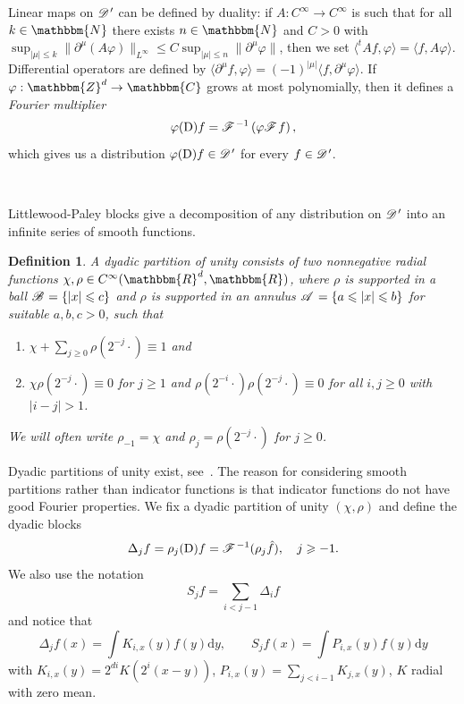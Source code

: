 \documentclass[11pt,reqno]{amsart}
\newcommand{\cdummy}{\cdot}
\newcommand{\mathD}{\mathrm{D}}
\newcommand{\mathd}{\mathrm{d}}
\newcommand{\nosymbol}{}
\newcommand{\tmtextit}[1]{{\itshape{#1}}}
\newtheorem{definition}[theorem]{Definition}
\newcommand{\CD}{\mathscr{D} \hspace{.1em}}
\newcommand{\CF}{\mathscr{F} \hspace{.1em}}
\newcommand{\CB}{\mathscr{B} \hspace{.1em}}
\newcommand{\CA}{\mathscr{A} \hspace{.1em}}
\begin{document}
Linear maps on $\CD'$ can be defined by duality: if $A : C^{\infty}
\rightarrow C^{\infty}$ is such that for all $k \in \mathbbm{N}$ there exists
$n \in \mathbbm{N}$ and $C > 0$ with $\sup_{| \mu | \leqslant k} \|
\partial^{\mu} (A \varphi) \|_{L^{\infty}} \leqslant C \sup_{| \mu | \leqslant
n} \| \partial^{\mu} \varphi \|$, then we set $\langle^t A f, \varphi \rangle
= \langle f, A \varphi \rangle$. Differential operators are defined by
$\langle \partial^{\mu} f, \varphi \rangle = (- 1)^{| \mu |} \langle f,
\partial^{\mu} \varphi \rangle$. If $\varphi : \mathbbm{Z}^d \rightarrow
\mathbbm{C}$ grows at most polynomially, then it defines a \tmtextit{Fourier
multiplier}
\[ \varphi (\mathD) f = \CF^{- 1} \left( \varphi \CF f \right), \]
which gives us a distribution $\varphi (\mathD) f \in \CD'$ for every $f \in
\CD'$.

\

Littlewood-Paley blocks give a decomposition of any distribution on $\CD'$
into an infinite series of smooth functions.

\begin{definition}
  A \tmtextit{dyadic partition of unity} consists of two nonnegative radial
  functions $\chi, \rho \in C^{\infty} (\mathbbm{R}^d, \mathbbm{R})$, where
  $\rho$ is supported in a ball $\CB = \{ | x | \leqslant c \}$ and $\rho$ is
  supported in an annulus $\CA = \{ a \leqslant | x | \leqslant b \}$ for
  suitable $a, b, c > 0$, such that
  \begin{enumerate}
    \item $\chi + \sum_{j \geqslant 0} \rho (2^{- j} \cdummy) \equiv 1$ and
    
    \item \label{property-2-dyadic}$\chi \rho (2^{- j} \cdummy) \equiv 0$ for
    $j \geqslant 1$ and $\rho (2^{- i} \cdummy) \rho (2^{- j} \nosymbol
    \cdummy) \equiv 0$ for all $i, j \geqslant 0$ with $| i - j | > 1$.
  \end{enumerate}
  We will often write $\rho_{- 1} = \chi$ and $\rho_j = \rho (2^{- j}
  \cdummy)$ for $j \geqslant 0$.
\end{definition}

Dyadic partitions of unity exist, see~{\cite{bahouri_fourier_2011}}. The
reason for considering smooth partitions rather than indicator functions is
that indicator functions do not have good Fourier properties. We fix a dyadic
partition of unity $(\chi, \rho)$ and define the dyadic blocks
\[ \Delta_j f = \rho_j (\mathD) f = \CF^{- 1} (\rho_j \hat{f}), \quad j
   \geqslant - 1. \]
We also use the notation
\[ S_j f = \sum_{i < j - 1} \Delta_i f \]
and notice that
\[ \Delta_j f (x) = \int K_{i, x} (y) f (y) \mathd y, \qquad S_j f (x) = \int
   P_{i, x} (y) f (y) \mathd y \]
with $K_{i, x} (y) = 2^{di} K (2^i (x - y))$, $P_{i, x} (y) = \sum_{j < i - 1}
K_{j, x} (y)$, $K$ radial with zero mean.
\end{document}
